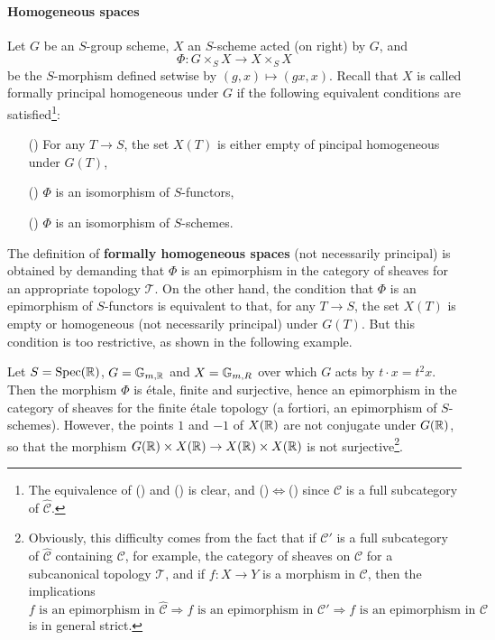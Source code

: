 \paragraph{Homogeneous spaces}
Let $G$ be an $S$-group scheme, $X$ an $S$-scheme acted (on right) by $G$, and
\[\Phi:G\times_SX\to X\times_SX\]
be the $S$-morphism defined setwise by $(g,x)\mapsto(gx,x)$. Recall that $X$ is called formally principal homogeneous under $G$ if the following equivalent conditions are satisfied\footnote{The equivalence of () and () is clear, and ()$\Leftrightarrow$() since $\mathcal{C}$ is a full subcategory of $\widehat{\mathcal{C}}$.}:
\begin{enumerate}
    \item[(\rmnum{1})] For any $T\to S$, the set $X(T)$ is either empty of pincipal homogeneous under $G(T)$,
    \item[(\rmnum{2})] $\Phi$ is an isomorphism of $S$-functors,
    \item[(\rmnum{3})] $\Phi$ is an isomorphism of $S$-schemes.  
\end{enumerate}
The definition of \textbf{formally homogeneous spaces} (not necessarily principal) is obtained by demanding that $\Phi$ is an epimorphism in the category of sheaves for an appropriate topology $\mathcal{T}$. On the other hand, the condition that $\Phi$ is an epimorphism of $S$-functors is equivalent to that, for any $T\to S$, the set $X(T)$ is empty or homogeneous (not necessarily principal) under $G(T)$. But this condition is too restrictive, as shown in the following example.

\begin{example}
Let $S=\mathrm{Spec}(\mathbb{R})$, $G=\mathbb{G}_{m,\mathbb{R}}$ and $X=\mathbb{G}_{m,R}$ over which $G$ acts by $t\cdot x=t^2x$. Then the morphism $\Phi$ is \'etale, finite and surjective, hence an epimorphism in the category of sheaves for the finite \'etale topology (a fortiori, an epimorphism of $S$-schemes). However, the points $1$ and $-1$ of $X(\mathbb{R})$ are not conjugate under $G(\mathbb{R})$, so that the morphism $G(\mathbb{R})\times X(\mathbb{R})\to X(\mathbb{R})\times X(\mathbb{R})$ is not surjective\footnote{Obviously, this difficulty comes from the fact that if $\mathcal{C}'$ is a full subcategory of $\widehat{\mathcal{C}}$ containing $\mathcal{C}$, for example, the category of sheaves on $\mathcal{C}$ for a subcanonical topology $\mathcal{T}$, and if $f:X\to Y$ is a morphism in $\mathcal{C}$, then the implications
\[\text{$f$ is an epimorphism in $\widehat{\mathcal{C}}$}\Rightarrow\text{$f$ is an epimorphism in $\mathcal{C}'$}\Rightarrow\text{$f$ is an epimorphism in $\mathcal{C}$}\]
is in general strict.
}.
\end{example}

